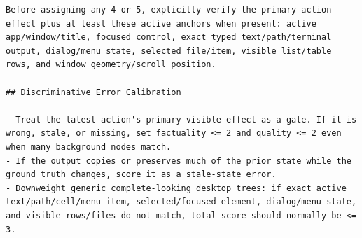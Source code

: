 \documentclass{llmxive}
\begin{document}
\begin{lstlisting}
Before assigning any 4 or 5, explicitly verify the primary action effect plus at least these active anchors when present: active app/window/title, focused control, exact typed text/path/terminal output, dialog/menu state, selected file/item, visible list/table rows, and window geometry/scroll position.

## Discriminative Error Calibration

- Treat the latest action's primary visible effect as a gate. If it is wrong, stale, or missing, set factuality <= 2 and quality <= 2 even when many background nodes match.
- If the output copies or preserves much of the prior state while the ground truth changes, score it as a stale-state error.
- Downweight generic complete-looking desktop trees: if exact active text/path/cell/menu item, selected/focused element, dialog/menu state, and visible rows/files do not match, total score should normally be <= 3.
\end{lstlisting}
\end{document}
